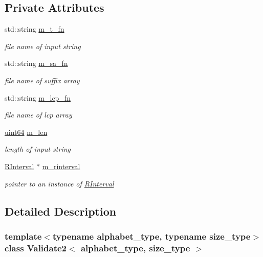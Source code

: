 \subsection*{Private Attributes}
\begin{DoxyCompactItemize}
\item 
std\+::string \hyperlink{class_validate2_aefa1d9c5ac628be8be94f03668782e07}{m\+\_\+t\+\_\+fn}
\begin{DoxyCompactList}\small\item\em file name of input string \end{DoxyCompactList}\item 
std\+::string \hyperlink{class_validate2_a50d06103a2020809e3e6848732870df1}{m\+\_\+sa\+\_\+fn}
\begin{DoxyCompactList}\small\item\em file name of suffix array \end{DoxyCompactList}\item 
std\+::string \hyperlink{class_validate2_abe354af8e4d3c9d59fe1898ca9ee9b45}{m\+\_\+lcp\+\_\+fn}
\begin{DoxyCompactList}\small\item\em file name of lcp array \end{DoxyCompactList}\item 
\hyperlink{types_8h_a60e8696a4678cd348e991a1f172e53f7}{uint64} \hyperlink{class_validate2_a64e02ffca40be106951a2325bc9d24e6}{m\+\_\+len}
\begin{DoxyCompactList}\small\item\em length of input string \end{DoxyCompactList}\item 
\hyperlink{struct_validate2_1_1_r_interval}{R\+Interval} $\ast$ \hyperlink{class_validate2_a1beb0a916dd1ad049b3b59f5058c5bb4}{m\+\_\+rinterval}
\begin{DoxyCompactList}\small\item\em pointer to an instance of \hyperlink{struct_validate2_1_1_r_interval}{R\+Interval} \end{DoxyCompactList}\end{DoxyCompactItemize}


\subsection{Detailed Description}
\subsubsection*{template$<$typename alphabet\+\_\+type, typename size\+\_\+type$>$\newline
class Validate2$<$ alphabet\+\_\+type, size\+\_\+type $>$}

